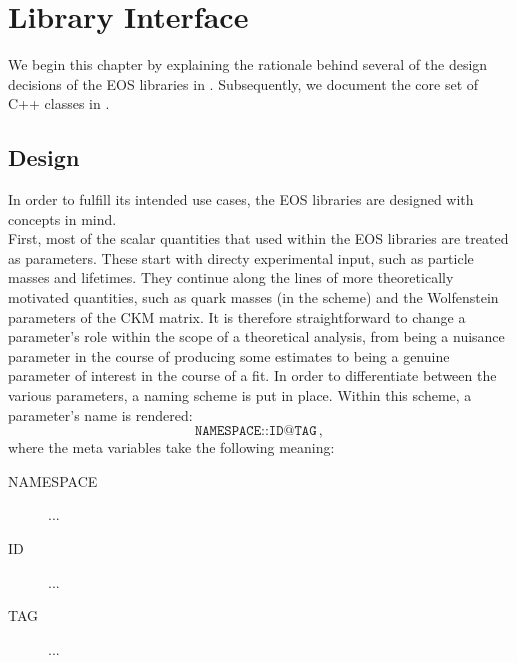 
\chapter{Library Interface}
\label{ch:interface}

We begin this chapter by explaining the rationale behind several of the design decisions of the
EOS libraries in . Subsequently, we document the core set of C++ classes
in .


\section{Design}
\label{sec:interface:design}

In order to fulfill its intended use cases, the EOS libraries are designed with concepts in mind.\\

First, most of the scalar quantities that used within the EOS libraries are treated as parameters.
These start with directy experimental input, such as particle masses and lifetimes. They continue
along the lines of more theoretically motivated quantities, such as quark masses (in the \MSbar{}
scheme) and the Wolfenstein parameters of the CKM matrix. It is therefore straightforward to change
a parameter's role within the scope of a theoretical analysis, from being a nuisance parameter in
the course of producing some estimates to being a genuine parameter of interest in the course of a
fit. In order to differentiate between the various parameters, a naming scheme is put in place.
Within this scheme, a parameter's name is rendered:
\begin{equation}
    \texttt{NAMESPACE::ID@TAG}\,,
\end{equation}
where the meta variables take the following meaning:
\begin{description}
    \item[NAMESPACE] ... \\
    \item[ID] ...\\
    \item[TAG] ...\\
\end{description}

